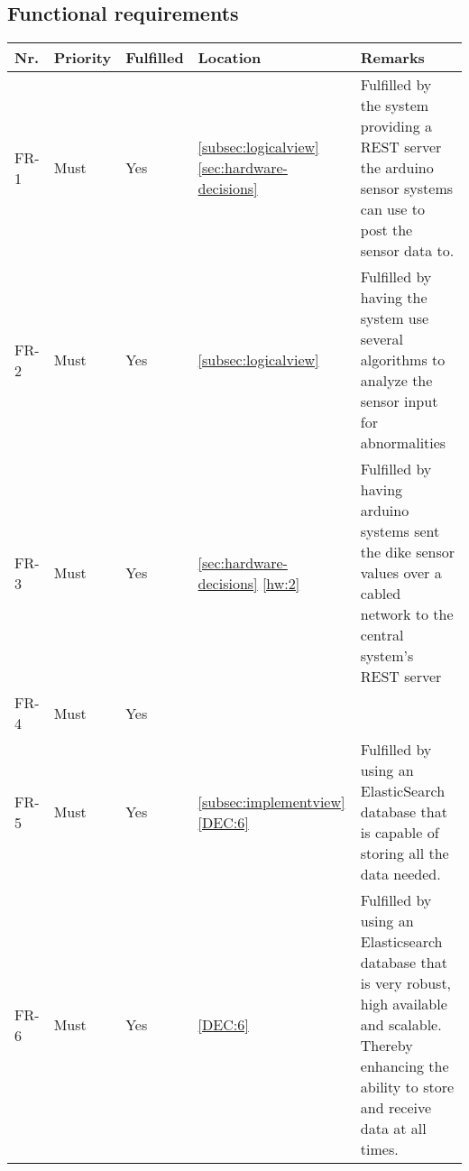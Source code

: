 \subsection{Functional requirements}
\begin{table}[H]
	\begin{tabular}{llllL{0.5\textwidth}}
						    
		Nr.   & Priority & Fulfilled & Location & Remarks \\ \hline
		
		FR-1  & Must     & Yes        & \ref{subsec:logicalview} \ref{sec:hardware-decisions} & Fulfilled by the system providing a REST server the arduino sensor systems can use to post the sensor data to. \\ 
		
		FR-2  & Must     & Yes       & \ref{subsec:logicalview}       & Fulfilled by having the system use several algorithms to analyze the sensor input for abnormalities \\ 
		FR-3  & Must     & Yes        & \ref{sec:hardware-decisions} \ref{hw:2}         & Fulfilled by having arduino systems sent the dike sensor values over a cabled network to the central system's REST server \\ 
		
		FR-4  & Must     & Yes        &          & ~       \\ 
		
		FR-5  & Must     & Yes        & \ref{subsec:implementview} \ref{DEC:6} & Fulfilled by using an ElasticSearch database that is capable of storing all the data needed.       \\ 
		
		FR-6  & Must     & Yes & \ref{DEC:6} & Fulfilled by using an Elasticsearch database that is very robust, high available and scalable. Thereby enhancing the ability to store and receive data at all times. \\
		

\end{tabular}
\end{table}
